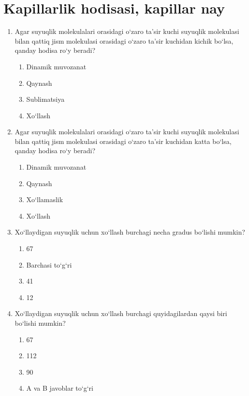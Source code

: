 \section{Kapillarlik hodisasi, kapillar nay}



\begin{enumerate}

\item Agar suyuqlik molekulalari orasidagi o‘zaro ta’sir kuchi suyuqlik molekulasi bilan qattiq jism molekulasi orasidagi o‘zaro ta’sir kuchidan kichik bo‘lsa, qanday hodisa ro‘y beradi?
\begin{enumerate}[label=\Alph*)]
\item Dinamik muvozanat
\item Qaynash
\item Sublimatsiya
\item Xo‘llash
\end{enumerate}

\item Agar suyuqlik molekulalari orasidagi o‘zaro ta’sir kuchi suyuqlik molekulasi bilan qattiq jism molekulasi orasidagi o‘zaro ta’sir kuchidan katta bo‘lsa, qanday hodisa ro‘y beradi?
\begin{enumerate}[label=\Alph*)]
\item Dinamik muvozanat
\item Qaynash
\item Xo‘llamaslik
\item Xo‘llash
\end{enumerate}

\item Xo‘llaydigan suyuqlik uchun xo‘llash burchagi necha gradus bo‘lishi mumkin?
\begin{enumerate}[label=\Alph*)]
\item 67
\item Barchasi to‘g‘ri
\item 41
\item 12

\end{enumerate}

\item Xo‘llaydigan suyuqlik uchun xo‘llash burchagi quyidagilardan qaysi biri bo‘lishi mumkin?
\begin{enumerate}[label=\Alph*)]
\item 67
\item 112
\item 90
\item A va B javoblar to‘g‘ri
\end{enumerate}


\end{enumerate}
